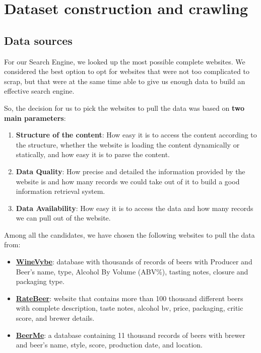 \section{Dataset construction and crawling}
\label{sec:dataset}

\subsection{Data sources}

For our Search Engine, we looked up the most possible complete websites. We considered the best option to opt for websites that were not too complicated to scrap, but that were at the same time able to give us enough data to build an effective search engine.

So, the decision for us to pick the websites to pull the data was based on \textbf{two main parameters}:

\begin{enumerate}
  \item \textbf{Structure of the content}: How easy it is to access the content according to the structure, whether the website is loading the content dynamically or statically, and how easy it is to parse the content.
  \item \textbf{Data Quality}: How precise and detailed the information provided by the website is and how many records we could take out of it to build a good information retrieval system.
  \item \textbf{Data Availability}: How easy it is to access the data and how many records we can pull out of the website.
\end{enumerate}

Among all the candidates, we have chosen the following websites to pull the data from:

\begin{itemize}
  \item \href{https://winevybe.com/}{\textbf{WineVybe}}: database with thousands of records of beers with Producer and Beer's name, type, Alcohol By Volume (ABV\%), tasting notes, closure and packaging type.
  \item \href{https://www.ratebeer.com/}{\textbf{RateBeer}}: website that contains more than 100 thousand different beers with complete description, taste notes, alcohol bv, price, packaging, critic score, and brewer details.
  \item \href{https://beerme.com/beerlist.php}{\textbf{BeerMe}}: a database containing 11 thousand records of beers with brewer and beer's name, style, score, production date, and location.
\end{itemize}

